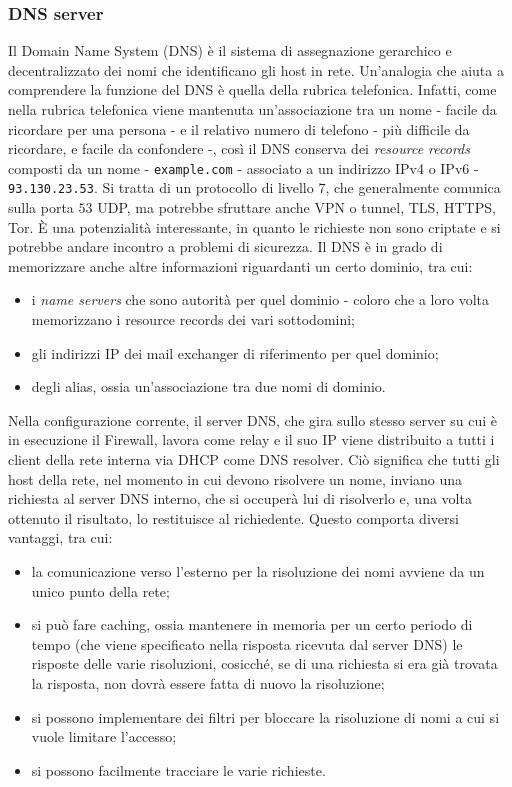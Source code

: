 \subsubsection{DNS server}
Il Domain Name System (DNS) è il sistema di assegnazione gerarchico e decentralizzato dei nomi che identificano gli host in rete. Un'analogia che aiuta a comprendere la funzione del DNS è quella della rubrica telefonica.
Infatti, come nella rubrica telefonica viene mantenuta un'associazione tra un nome - facile da ricordare per una persona -  e il relativo numero di telefono - più difficile da ricordare, e facile da confondere -, così il DNS conserva dei \emph{resource records} composti da un nome - \texttt{example.com} - associato a un indirizzo IPv4 o IPv6 -  \texttt{93.130.23.53}.
Si tratta di un protocollo di livello $7$, che generalmente comunica sulla porta $53$ UDP, ma potrebbe sfruttare anche VPN o tunnel, TLS, HTTPS, Tor. È una potenzialità interessante, in quanto le richieste non sono criptate e si potrebbe andare incontro a problemi di sicurezza.
Il DNS è in grado di memorizzare anche altre informazioni riguardanti un certo dominio, tra cui:
\begin{itemize}
    \item i \emph{name servers} che sono autorità per quel dominio - coloro che a loro volta memorizzano i resource records dei vari sottodomini;
    \item gli indirizzi IP dei mail exchanger di riferimento per quel dominio;
    \item degli alias, ossia un'associazione tra due nomi di dominio.
\end{itemize}
Nella configurazione corrente, il server DNS, che gira sullo stesso server su cui è in esecuzione il Firewall, lavora come relay e il suo IP viene distribuito a tutti i client della rete interna via DHCP come DNS resolver.
Ciò significa che tutti gli host della rete, nel momento in cui devono risolvere un nome, inviano una richiesta al server DNS interno, che si occuperà lui di risolverlo e, una volta ottenuto il risultato, lo restituisce al richiedente.
Questo comporta diversi vantaggi, tra cui:
\begin{itemize}
    \item la comunicazione verso l'esterno per la risoluzione dei nomi avviene da un unico punto della rete;
    \item si può fare caching, ossia mantenere in memoria per un certo periodo di tempo (che viene specificato nella risposta ricevuta dal server DNS) le risposte delle varie risoluzioni, cosicché, se di una richiesta si era già trovata la risposta, non dovrà essere fatta di nuovo la risoluzione;
    \item si possono implementare dei filtri per bloccare la risoluzione di nomi a cui si vuole limitare l'accesso;
    \item si possono facilmente tracciare le varie richieste.
\end{itemize}


